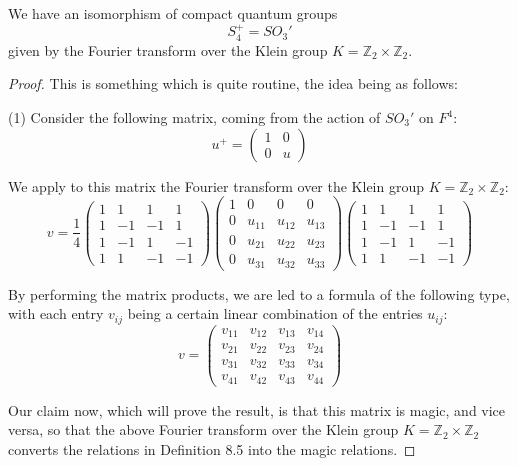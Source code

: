 \documentclass[10pt,a4paper]{amsart}
\begin{document}
\begin{theorem}
We have an isomorphism of compact quantum groups
$$S_4^+=SO_3'$$
given by the Fourier transform over the Klein group $K=\mathbb Z_2\times\mathbb Z_2$.
\end{theorem}

\begin{proof}
This is something which is quite routine, the idea being as follows:

\medskip

(1) Consider the following matrix, coming from the action of $SO_3'$ on $F^4$:
$$u^+=\begin{pmatrix}1&0\\0&u\end{pmatrix}$$

We apply to this matrix the Fourier transform over the Klein group $K=\mathbb Z_2\times\mathbb Z_2$: 
$$v=
\frac{1}{4}
\begin{pmatrix}
1&1&1&1\\
1&-1&-1&1\\
1&-1&1&-1\\
1&1&-1&-1
\end{pmatrix}
\begin{pmatrix}
1&0&0&0\\
0&u_{11}&u_{12}&u_{13}\\
0&u_{21}&u_{22}&u_{23}\\
0&u_{31}&u_{32}&u_{33}
\end{pmatrix}
\begin{pmatrix}
1&1&1&1\\
1&-1&-1&1\\
1&-1&1&-1\\
1&1&-1&-1
\end{pmatrix}$$

By performing the matrix products, we are led to a formula of the following type, with each entry $v_{ij}$ being a certain linear combination of the entries $u_{ij}$:
$$v=\begin{pmatrix}
v_{11}&v_{12}&v_{13}&v_{14}\\
v_{21}&v_{22}&v_{23}&v_{24}\\
v_{31}&v_{32}&v_{33}&v_{34}\\
v_{41}&v_{42}&v_{43}&v_{44}
\end{pmatrix}$$

Our claim now, which will prove the result, is that this matrix is magic, and vice versa, so that the above Fourier transform over the Klein group $K=\mathbb Z_2\times\mathbb Z_2$ converts the relations in Definition 8.5 into the magic relations.


\end{proof}
\end{document}
